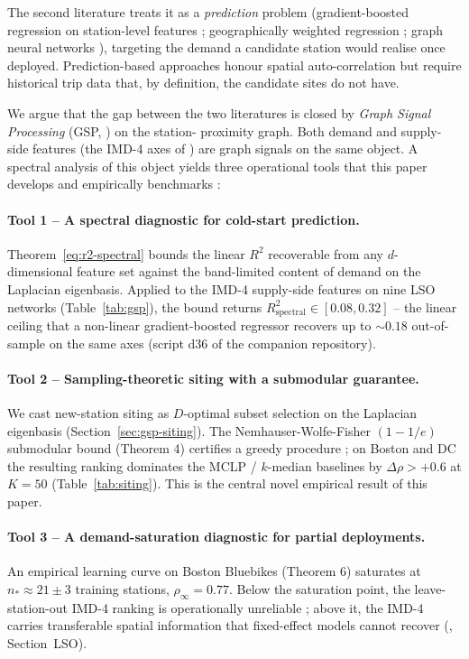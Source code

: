 \documentclass[11pt,a4paper]{article}
\newcommand{\1}{\mathbb{1}}
\theoremstyle{plain}
\theoremstyle{definition}
\theoremstyle{remark}
\begin{document}
The second literature treats it as a \emph{prediction} problem
(gradient-boosted regression on station-level features
\citep{FaghihImani2014,FossePallares2026bikeshareDemand};
geographically weighted regression \citep{Mooney2017}; graph
neural networks \citep{Kipf2017,Lin2018}), targeting the
demand a candidate station would realise once deployed.
Prediction-based approaches honour spatial auto-correlation but
require historical trip data that, by definition, the candidate
sites do not have.

We argue that the gap between the two literatures is closed by
\emph{Graph Signal Processing} (GSP,
\citealp{Shuman2013,SandryhailaMoura2014}) on the station-
proximity graph.  Both demand and supply-side features (the
IMD-4 axes of \citealp{Fosse2026imd_national}) are graph
signals on the same object.  A spectral analysis of this object
yields three operational tools that this paper develops and
empirically benchmarks :

\paragraph{Tool 1 -- A spectral diagnostic for cold-start
prediction.}  Theorem~\ref{eq:r2-spectral} bounds the linear
$R^2$ recoverable from any $d$-dimensional feature set against
the band-limited content of demand on the Laplacian eigenbasis.
Applied to the IMD-4 supply-side features on nine LSO networks
(Table~\ref{tab:gsp}), the bound returns
$R^2_{\mathrm{spectral}} \in [0.08, 0.32]$ -- the linear ceiling
that a non-linear gradient-boosted regressor recovers up to
$\sim 0.18$ out-of-sample on the same axes (script d36 of the
companion repository).

\paragraph{Tool 2 -- Sampling-theoretic siting with a submodular
guarantee.}  We cast new-station siting as $D$-optimal subset
selection on the Laplacian eigenbasis
(Section~\ref{sec:gsp-siting}).  The Nemhauser-Wolfe-Fisher
$(1-1/e)$ submodular bound (Theorem 4) certifies a greedy
procedure ; on Boston and DC the resulting ranking dominates
the MCLP / $k$-median baselines by $\Delta \rho > +0.6$ at
$K = 50$ (Table~\ref{tab:siting}).  This is the central novel
empirical result of this paper.

\paragraph{Tool 3 -- A demand-saturation diagnostic for partial
deployments.}  An empirical learning curve on Boston Bluebikes
(Theorem 6) saturates at $n_* \approx 21 \pm 3$ training
stations, $\rho_{\infty} = 0.77$.  Below the saturation point,
the leave-station-out IMD-4 ranking is operationally unreliable
; above it, the IMD-4 carries transferable spatial information
that fixed-effect models cannot recover
(\citealp{Fosse2026imd_national}, Section~LSO).
\end{document}

